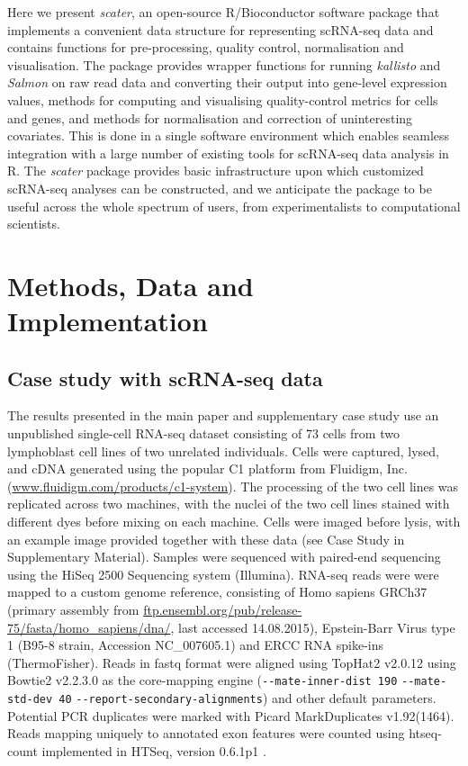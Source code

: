 \documentclass[10pt,letterpaper]{article}
\begin{document}
Here we present \emph{scater}, an open-source R/Bioconductor software package that implements a convenient data structure for representing scRNA-seq data and contains functions for pre-processing, quality control, normalisation and visualisation. The package provides wrapper functions for running \emph{kallisto} and \emph{Salmon} on raw read data and converting their output into gene-level expression values, methods for computing and visualising quality-control metrics for cells and genes, and methods for normalisation and correction of uninteresting covariates. This is done in a single software environment which enables seamless integration with a large number of existing tools for scRNA-seq data analysis in R. The \emph{scater} package provides basic infrastructure upon which customized scRNA-seq analyses can be constructed, and we anticipate the package to be useful across the whole spectrum of users, from experimentalists to computational scientists.\vspace*{-12pt}


\section*{Methods, Data and Implementation}\label{methods-data-and-implementation}

\subsection*{Case study with scRNA-seq data}\label{case-study-with-scrna-seq-data}

The results presented in the main paper and supplementary case study use an unpublished single-cell RNA-seq dataset consisting of 73 cells from two lymphoblast cell lines of two unrelated individuals. Cells were captured, lysed, and cDNA generated using the popular C1 platform from Fluidigm, Inc. (\href{https://www.fluidigm.com/products/c1-system}{www.fluidigm.com/products/c1-system}). The processing of the two cell lines was replicated across two machines, with the nuclei of the two cell lines stained with different dyes before mixing on each machine. Cells were imaged before lysis, with an example image provided together with these data (see Case Study in Supplementary Material). Samples were sequenced with paired-end sequencing using the HiSeq 2500 Sequencing system (Illumina). RNA-seq reads were were mapped to a custom genome reference, consisting of Homo sapiens GRCh37 (primary assembly from \href{ftp://ftp.ensembl.org/pub/release-75/fasta/homo_sapiens/dna/}{ftp.ensembl.org/pub/release-75/fasta/homo\_sapiens/dna/}, last accessed 14.08.2015), Epstein-Barr Virus type 1 (B95-8 strain, Accession NC\_007605.1) and ERCC RNA spike-ins (ThermoFisher).  Reads in fastq format were aligned using TopHat2 v2.0.12 \citep{Kim2013-qb} using Bowtie2 v2.2.3.0 \citep{Langmead2012-yc} as the core-mapping engine (\verb|--mate-inner-dist 190| \verb|--mate-std-dev 40| \verb|--report-secondary-alignments|) and other default parameters. Potential PCR duplicates were marked with Picard MarkDuplicates v1.92(1464). Reads mapping uniquely to annotated exon features were counted using htseq-count implemented in HTSeq, version 0.6.1p1 \citep{Anders2015-wf}.
\end{document}
